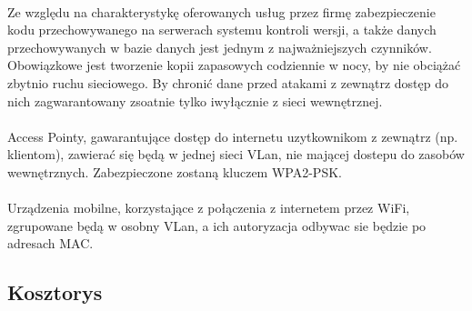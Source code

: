 \paragraph{}
Ze względu na charakterystykę oferowanych usług przez firmę zabezpieczenie kodu przechowywanego na serwerach systemu kontroli wersji, a także danych przechowywanych w bazie danych jest jednym z najważniejszych czynników. Obowiązkowe jest tworzenie kopii zapasowych codziennie w nocy, by nie obciążać zbytnio ruchu sieciowego. By chronić dane przed atakami z zewnątrz dostęp do nich zagwarantowany zsoatnie tylko iwyłącznie z sieci wewnętrznej.

\paragraph{}
Access Pointy, gawarantujące dostęp do internetu uzytkownikom z zewnątrz (np. klientom), zawierać się będą w jednej sieci VLan, nie mającej dostepu do zasobów wewnętrznych. Zabezpieczone zostaną kluczem WPA2-PSK.

\paragraph{}
Urządzenia mobilne, korzystające z połączenia z internetem przez WiFi, zgrupowane będą w osobny VLan, a ich autoryzacja odbywac sie będzie po adresach MAC.

\subsection{Kosztorys}
\paragraph{}

